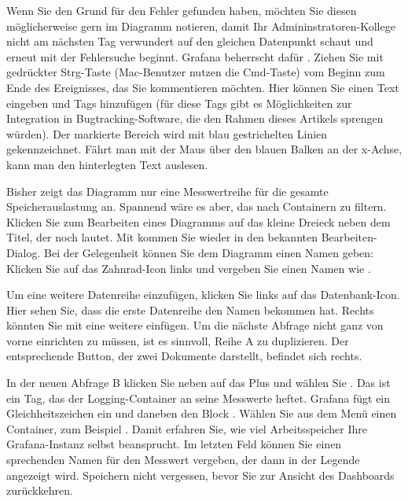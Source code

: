 
Wenn Sie den Grund für den Fehler gefunden haben, möchten Sie diesen möglicherweise gern im Diagramm notieren, damit Ihr Admininstratoren-Kollege nicht am nächsten Tag verwundert auf den gleichen Datenpunkt schaut und erneut mit der Fehlersuche beginnt. Grafana beherrscht dafür . Ziehen Sie mit gedrückter Strg-Taste (Mac-Benutzer nutzen die Cmd-Taste) vom Beginn zum Ende des Ereignisses, das Sie kommentieren möchten. Hier können Sie einen Text eingeben und Tags hinzufügen (für diese Tags gibt es Möglichkeiten zur Integration in Bugtracking-Software, die den Rahmen dieses Artikels sprengen würden). Der markierte Bereich wird mit blau gestrichelten Linien gekennzeichnet. Fährt man mit der Maus über den blauen Balken an der x-Achse, kann man den hinterlegten Text auslesen.

Bisher zeigt das Diagramm nur eine Messwertreihe für die gesamte Speicherauslastung an. Spannend wäre es aber, das nach Containern zu filtern. Klicken Sie zum Bearbeiten eines Diagramms auf das kleine Dreieck neben dem Titel, der noch  lautet. Mit  kommen Sie wieder in den bekannten Bearbeiten-Dialog. Bei der Gelegenheit können Sie dem Diagramm einen Namen geben: Klicken Sie auf das Zahnrad-Icon links und vergeben Sie einen Namen wie .

Um eine weitere Datenreihe einzufügen, klicken Sie links auf das Datenbank-Icon. Hier sehen Sie, dass die erste Datenreihe den Namen  bekommen hat. Rechts könnten Sie mit  eine weitere einfügen. Um die nächste Abfrage nicht ganz von vorne einrichten zu müssen, ist es sinnvoll, Reihe A zu duplizieren. Der entsprechende Button, der zwei Dokumente darstellt, befindet sich rechts.

In der neuen Abfrage B klicken Sie neben  auf das Plus und wählen Sie . Das ist ein Tag, das der Logging-Container an seine Messwerte heftet. Grafana fügt ein Gleichheitszeichen ein und daneben den Block . Wählen Sie aus dem Menü einen Container, zum Beispiel . Damit erfahren Sie, wie viel Arbeitsspeicher Ihre Grafana-Instanz selbst beansprucht. Im letzten Feld  können Sie einen sprechenden Namen für den Messwert vergeben, der dann in der Legende angezeigt wird. Speichern nicht vergessen, bevor Sie zur Ansicht des Dashboards zurückkehren.

